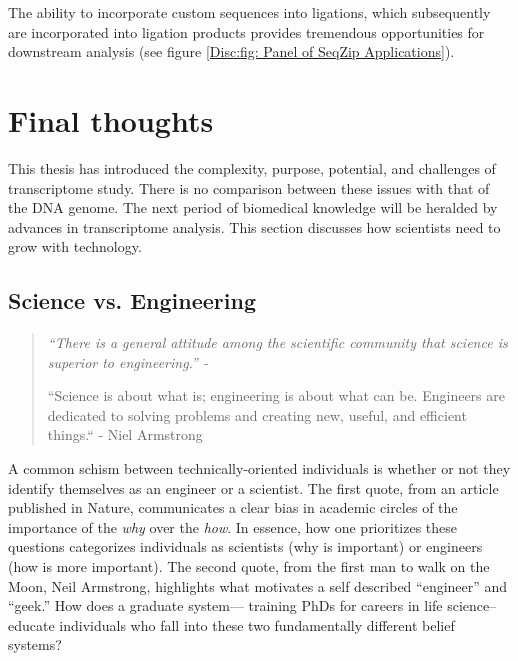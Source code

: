       The ability to incorporate custom sequences into ligations, which subsequently are incorporated into ligation products provides tremendous opportunities for downstream analysis (see figure \ref{Disc:fig: Panel of SeqZip Applications}).


\section{Final thoughts}
  \label{Disc:sec:Final Thoughts}

  This thesis has introduced the complexity, purpose, potential, and challenges of transcriptome study. There is no comparison between these issues with that of the DNA genome. The next period of biomedical knowledge will be heralded by advances in transcriptome analysis. This section discusses how scientists need to grow with technology.

  \subsection{Science vs. Engineering}
    \label{Disc:subsec:Science and Engineering}

    \begin{quote}
      \itshape 
      \singlespacing
        “There is a general attitude among the scientific community that science is superior to engineering.” - \citep{Macilwain2010}

      “Science is about what is; engineering is about what can be. Engineers are dedicated to solving problems and creating new, useful, and efficient things.“ - Niel Armstrong
      \end{quote}

    A common schism between technically-oriented individuals is whether or not they identify themselves as an engineer or a scientist. The first quote, from an article published in Nature, communicates a clear bias in academic circles of the importance of the \textit{why} over the \textit{how}. In essence, how one prioritizes these questions categorizes individuals as scientists (why is important) or engineers (how is more important). The second quote, from the first man to walk on the Moon, Neil Armstrong, highlights what motivates a self described ``engineer'' and ``geek.'' How does a graduate system--- training PhDs for careers in life science--educate individuals who fall into these two fundamentally different belief systems?


